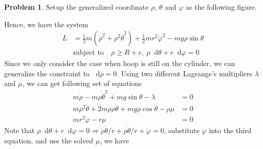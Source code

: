 \documentclass[twoside,11pt]{article}
\newcommand{\lms}{\fontfamily{lmss}\selectfont} %
\renewcommand*\d{\mathop{}\!\mathrm{d}}
\theoremstyle{definition}
\newtheorem{problem}{\lms Problem}
\theoremstyle{remark}
\begin{document}
\newpage
\begin{problem}
Setup the generalized coordinate $\rho$, $\theta$ and $\varphi$ as the following figure.
\begin{figure}[H]
    \centering
\end{figure}
Hence, we have the system 
\begin{align*}
    L &= \frac{1}{2}m(\dot{\rho}^2 + \rho^2\dot{\theta}^2)
    + \frac{1}{2}mr^2\dot{\varphi}^2 - mg\rho\sin\theta\\
    & \text{subject to}\quad \rho\geq R+r,~\rho\d\theta + r\d\varphi = 0
\end{align*}
Since we only consider the case when hoop is still on the cylinder, 
we can generalize the constraint to $\d\rho = 0$.
Using two different Lagrange's multipliers $\lambda$ and $\mu$,
we can get following set of equations
\begin{align*}
    m\ddot{\rho} - m\rho\dot{\theta}^2 + mg\sin\theta - \lambda &= 0\\
    m\rho^2\ddot{\theta} + 2m\rho\dot{\rho}\dot{\theta} + mg\rho\cos\theta
    -\rho\mu &= 0\\
    mr^2\ddot{\varphi} - r\mu &= 0
\end{align*}
Note that $\rho\d\theta + r\d\varphi = 0
\Rightarrow \dot{\rho}\dot{\theta}/r + \rho\ddot{\theta}/r + \ddot{\varphi}=0$,
substitute $\ddot{\varphi}$ into the third equation, and use the solved $\mu$, we have
\begin{align*}

\end{align*}
\end{problem}
\end{document}

